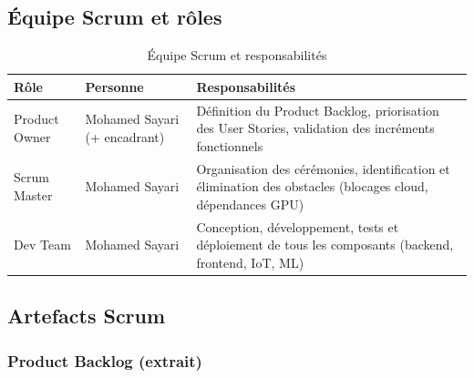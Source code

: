\subsection{Équipe Scrum et rôles}

\begin{table}[H]
\centering
\caption{Équipe Scrum et responsabilités}
\label{tab:scrum_team}
\begin{tabular}{llp{7cm}}
\toprule
\textbf{Rôle} & \textbf{Personne} & \textbf{Responsabilités} \\
\midrule
Product Owner  & Mohamed Sayari (+ encadrant) &
  Définition du Product Backlog, priorisation des User Stories,
  validation des incréments fonctionnels \\
Scrum Master   & Mohamed Sayari &
  Organisation des cérémonies, identification et élimination des
  obstacles (blocages cloud, dépendances GPU) \\
Dev Team       & Mohamed Sayari &
  Conception, développement, tests et déploiement de tous les
  composants (backend, frontend, IoT, ML) \\
\bottomrule
\end{tabular}
\end{table}

\subsection{Artefacts Scrum}

\subsubsection{Product Backlog (extrait)}

